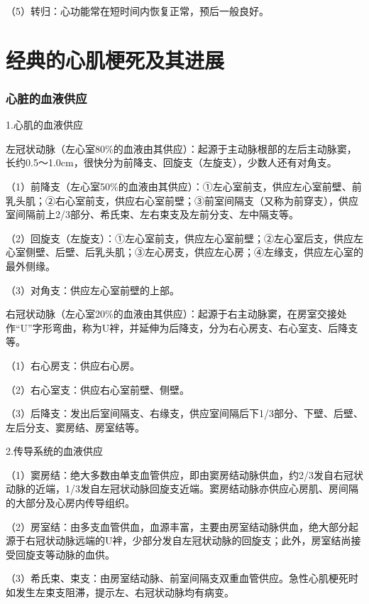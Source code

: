 （5）转归：心功能常在短时间内恢复正常，预后一般良好。

\protect\hypertarget{text00052.html}{}{}

\protect\hypertarget{text00052.htmlux5cux23chapter52}{}{}

\chapter{经典的心肌梗死及其进展}

\protect\hypertarget{text00052.htmlux5cux23subid622}{}{}

\subsection{心脏的血液供应}

1.心肌的血液供应

左冠状动脉（左心室80\%的血液由其供应）：起源于主动脉根部的左后主动脉窦，长约0.5～1.0cm，很快分为前降支、回旋支（左旋支），少数人还有对角支。

（1）前降支（左心室50\%的血液由其供应）：①左心室前支，供应左心室前壁、前乳头肌；②右心室前支，供应右心室前壁；③前室间隔支（又称为前穿支），供应室间隔前上2/3部分、希氏束、左右束支及左前分支、左中隔支等。

（2）回旋支（左旋支）：①左心室前支，供应左心室前壁；②左心室后支，供应左心室侧壁、后壁、后乳头肌；③左心房支，供应左心房；④左缘支，供应左心室的最外侧缘。

（3）对角支：供应左心室前壁的上部。

右冠状动脉（左心室20\%的血液由其供应）：起源于右主动脉窦，在房室交接处作“U”字形弯曲，称为U袢，并延伸为后降支，分为右心房支、右心室支、后降支等。

（1）右心房支：供应右心房。

（2）右心室支：供应右心室前壁、侧壁。

（3）后降支：发出后室间隔支、右缘支，供应室间隔后下1/3部分、下壁、后壁、左后分支、窦房结、房室结等。

2.传导系统的血液供应

（1）窦房结：绝大多数由单支血管供应，即由窦房结动脉供血，约2/3发自右冠状动脉的近端，1/3发自左冠状动脉回旋支近端。窦房结动脉亦供应心房肌、房间隔的大部分及心房内传导组织。

（2）房室结：由多支血管供血，血源丰富，主要由房室结动脉供血，绝大部分起源于右冠状动脉远端的U袢，少部分发自左冠状动脉的回旋支；此外，房室结尚接受回旋支等动脉的血供。

（3）希氏束、束支：由房室结动脉、前室间隔支双重血管供应。急性心肌梗死时如发生左束支阻滞，提示左、右冠状动脉均有病变。

